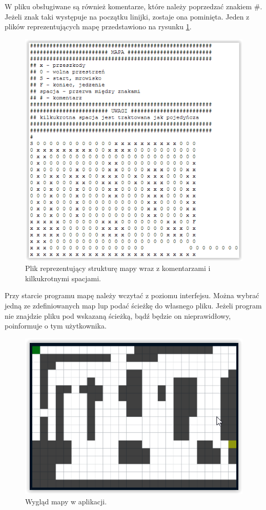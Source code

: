 \documentclass[printmode, openany, oneside, eng]{mgr}
\begin{document}
W pliku obsługiwane są również komentarze, które należy poprzedzać znakiem $\#$. Jeżeli znak taki występuje na początku linijki, zostaje ona pominięta. Jeden z plików reprezentujących mapę przedstawiono na rysunku \ref{fig:map2}. \newline

\begin{figure}[h]
\centering
\includegraphics[scale=1]{img/map2.png}
\caption{Plik reprezentujący strukturę mapy wraz z komentarzami i kilkukrotnymi spacjami.}
\label{fig:map2}
\end{figure}

Przy starcie programu mapę należy wczytać z poziomu interfejsu. Można wybrać jedną ze zdefiniowanych map lup podać ścieżkę do własnego pliku. Jeżeli program nie znajdzie pliku pod wskazaną ścieżką, bądź będzie on nieprawidłowy, poinformuje o tym użytkownika.\newline

\begin{figure}[h]
\centering
\includegraphics[scale=1]{img/map3.png}
\caption{Wygląd mapy w aplikacji.}
\label{fig:map3}
\end{figure}
\end{document}
